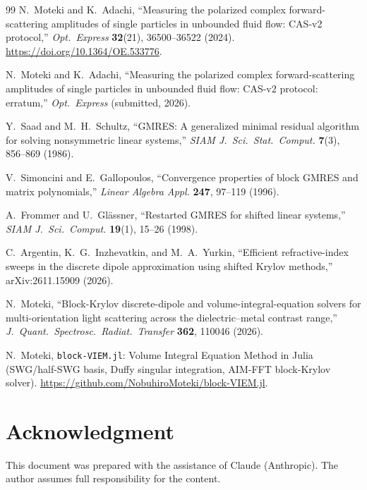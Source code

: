 \documentclass[11pt,a4paper]{article}
\begin{document}
\begin{thebibliography}{99}
  N.~Moteki and K.~Adachi,
  ``Measuring the polarized complex forward-scattering amplitudes of
  single particles in unbounded fluid flow: CAS-v2 protocol,''
  \textit{Opt.\ Express} \textbf{32}(21), 36500--36522 (2024).
  \url{https://doi.org/10.1364/OE.533776}.

  N.~Moteki and K.~Adachi,
  ``Measuring the polarized complex forward-scattering amplitudes of
  single particles in unbounded fluid flow: CAS-v2 protocol: erratum,''
  \textit{Opt.\ Express} (submitted, 2026).

  Y.~Saad and M.~H.~Schultz,
  ``GMRES: A generalized minimal residual algorithm for solving
  nonsymmetric linear systems,''
  \textit{SIAM J.\ Sci.\ Stat.\ Comput.} \textbf{7}(3), 856--869 (1986).

  V.~Simoncini and E.~Gallopoulos,
  ``Convergence properties of block GMRES and matrix polynomials,''
  \textit{Linear Algebra Appl.} \textbf{247}, 97--119 (1996).

  A.~Frommer and U.~Gl\"assner,
  ``Restarted GMRES for shifted linear systems,''
  \textit{SIAM J.\ Sci.\ Comput.} \textbf{19}(1), 15--26 (1998).

  C.~Argentin, K.~G.~Inzhevatkin, and M.~A.~Yurkin,
  ``Efficient refractive-index sweeps in the discrete dipole approximation
  using shifted Krylov methods,''
  arXiv:2611.15909 (2026).

  N.~Moteki,
  ``Block-Krylov discrete-dipole and volume-integral-equation solvers for
  multi-orientation light scattering across the dielectric--metal contrast
  range,''
  \textit{J.\ Quant.\ Spectrosc.\ Radiat.\ Transfer} \textbf{362},
  110046 (2026).

  N.~Moteki,
  \texttt{block-VIEM.jl}: Volume Integral Equation Method in Julia
  (SWG/half-SWG basis, Duffy singular integration, AIM-FFT
  block-Krylov solver).
  \url{https://github.com/NobuhiroMoteki/block-VIEM.jl}.
\end{thebibliography}

\section*{Acknowledgment}

This document was prepared with the assistance of Claude (Anthropic).
The author assumes full responsibility for the content.
\end{document}
